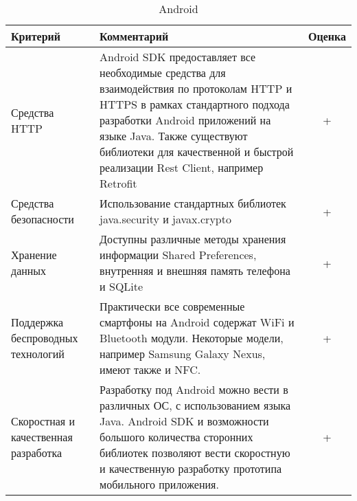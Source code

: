 \bgroup %
\def\arraystretch{1.5}%
  \begin{longtable}{| p{} | p{} | c |} 
  \caption{Android} %
  \hline
    Критерий & Комментарий & Оценка \\
  \hline
    Средства HTTP

    & Android SDK предоставляет все необходимые средства для взаимодействия по протоколам HTTP и HTTPS в рамках стандартного подхода разработки Android приложений на языке Java. Также существуют библиотеки для качественной и быстрой реализации Rest Client, например Retrofit

    & + \\
  \hline
    Средства безопасности

    & Использование стандартных библиотек java.security и javax.crypto
    
    & + \\
  \hline
    Хранение данных

    & Доступны различные методы хранения информации Shared Preferences, внутренняя и внешняя память телефона и SQLite

    & + \\
  \hline
    Поддержка беспроводных технологий 
    
    & Практически все современные смартфоны на Android содержат WiFi и Bluetooth модули. Некоторые модели, например Samsung Galaxy Nexus, имеют также и NFC.

    & + \\
  \hline
    Скоростная и качественная разработка
    
    & Разработку под Android можно вести в различных ОС, с использованием языка Java. Android SDK и возможности большого количества сторонних библиотек позволяют вести скоростную и качественную разработку прототипа мобильного приложения.

    & + \\
  \hline

  \end{longtable}
\egroup %

\pagebreak

